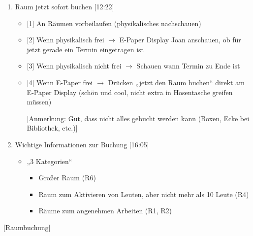 \begin{enumerate}
    \item Raum jetzt sofort buchen [12:22]
     \begin{itemize}
        \item{} [1] An Räumen vorbeilaufen (physikalisches nachschauen)
        \item{} [2] Wenn physikalisch frei $\rightarrow$ E-Paper Display Joan anschauen, ob für jetzt gerade ein Termin eingetragen ist
        \item{} [3] Wenn physikalisch nicht frei $\rightarrow$ Schauen wann Termin zu Ende ist
        \item{} [4] Wenn E-Paper frei $\rightarrow$ Drücken „jetzt den Raum buchen“ direkt am E-Paper Display (schön und cool, nicht extra in Hosentasche greifen müssen)
        \item[] [Anmerkung: Gut, dass nicht alles gebucht werden kann (Boxen, Ecke bei Bibliothek, etc.)]
    \end{itemize}
    
    \item Wichtige Informationen zur Buchung [16:05]
     \begin{itemize}
        \item „3 Kategorien“
        \begin{itemize}
            \item Großer Raum (R6)
            \item Raum zum Aktivieren von Leuten, aber nicht mehr als 10 Leute (R4)
            \item Räume zum angenehmen Arbeiten (R1, R2)
        \end{itemize}
    \end{itemize}

\end{enumerate}

[Raumbuchung]

